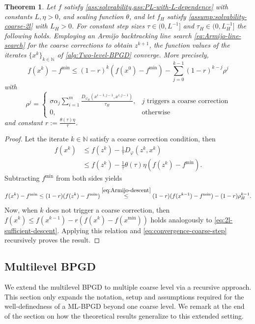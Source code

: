 \documentclass[11pt,reqno]{amsart}
\numberwithin{equation}{section}
\numberwithin{figure}{section}
\theoremstyle{plain}
\newtheorem{theorem}{Theorem}[section]
\theoremstyle{definition}
\newcommand{\N}{\mathbb{N}}
\newcommand{\vphi}{\varphi}
\begin{document}
\begin{theorem}\label{thm:2l-convergence}
Let $f$ satisfy \cref{ass:solveability,ass:PL-with-L-dependence} with constants $L, \eta > 0$, and scaling function $\theta$, and let $f_H$ satisfy \cref{assump:solvability-coarse-2l} with $L_H > 0$. For constant step sizes $\tau \in (0, L^{-1}]$ and $\tau_H \in (0, L^{-1}_H]$ the following holds. Employing an Armijo backtracking line search \eqref{eq:Armijo-line-search} for the coarse corrections to obtain $z^{k+1}$, the function values of the iterates $\{x^k\}_{k \in \N}$ of \cref{alg:Two-level-BPGD} converge. More precisely,
\begin{equation}
    f(x^k) - f^{\min} \leq \left(1- r \right)^k (f(x^0) - f^{\min}) - \sum_{j = 0}^{k-1} (1-r)^{k-j} \rho^j
\end{equation}
with 
\begin{equation}
    \rho^j = 
    \begin{cases}
        \sigma \alpha_j \sum_{i = 1}^m \frac{D_{\vphi_H}(x^{i-1,j-1}, x^{i,j-1})}{\tau_H}, &j \text{ triggers a coarse correction} \\
        0, &\text{otherwise}
    \end{cases}
\end{equation}
and constant $r := \frac{\theta(\tau) \eta}{\tau}$.
\end{theorem}
\begin{proof}
Let the iterate $k \in \N$ satisfy a coarse correction condition, then
    \begin{align} \label{eq:2l-sufficient-descent}
        f(x^k) &\leq f(z^k) - \frac{1}{\tau} D_\vphi(z^k, x^k) \\ &\leq f(z^k) - \frac{1}{\tau} \theta(\tau) \eta (f(z^k) - f^{\min}).
    \end{align}
    Subtracting $f^{\min}$ from both sides yields
    \begin{equation} \label{eq:convergence-coarse-step}
        f(x^k) - f^{\min} \leq (1-r) (f(z^{k}) - f^{\min}) \overset{\eqref{eq:Armijo-descent}}{\leq} (1-r) (f(x^{k-1}) - f^{\min}) - (1-r)\rho_H^{k-1}.
    \end{equation}
    Now, when $k$ does not trigger a coarse correction, then $f(x^k) \leq f(x^{k-1}) - r(f(x^k) - f(x^{\min}))$ holds analogously to  \eqref{eq:2l-sufficient-descent}. 
    Applying this relation and \eqref{eq:convergence-coarse-step} recursively proves the result.
\end{proof}
\subsection{Multilevel BPGD}\label{sec:MLBPGD}
We extend the multilevel BPGD to multiple coarse level via a recursive approach. This section only expands the notation, setup and assumptions required for the well-definedness of a ML-BPGD beyond one coarse level. We remark at the end of the section on how the theoretical results generalize to this extended setting.
\end{document}
